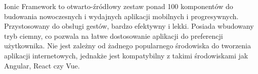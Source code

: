 Ionic Framework to otwarto-źródłowy zestaw  ponad 100 komponentów do budowania nowoczesnych i wydajnych aplikacji mobilnych i progresywnych. Przystosowany do obsługi gestów, bardzo efektywny i lekki. Posiada wbudowany tryb ciemny, co pozwala na łatwe dostosowanie aplikacji do preferencji użytkownika. Nie jest zależny od żadnego popularnego środowiska do tworzenia aplikacji internetowych, jednakże jest kompatybilny z takimi środowiskami jak Angular, React czy Vue. \autocite{ionic}